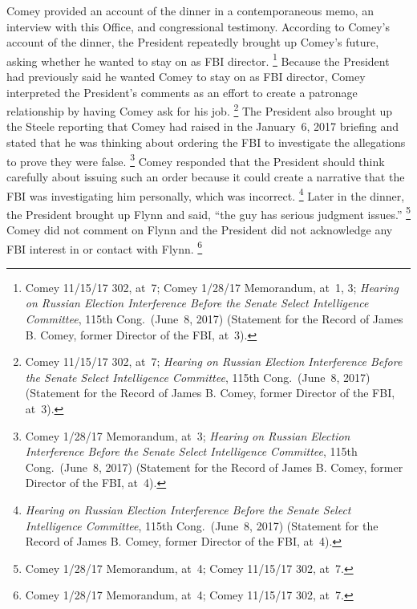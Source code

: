 Comey provided an account of the dinner in a contemporaneous memo, an interview with this Office, and congressional testimony.
According to Comey's account of the dinner, the President repeatedly brought up Comey's future, asking whether he wanted to stay on as FBI director.%
\footnote{Comey 11/15/17 302, at~7;
Comey 1/28/17 Memorandum, at~1, 3;
\textit{Hearing on Russian Election Interference Before the Senate Select Intelligence Committee}, 115th Cong.\ (June~8, 2017) (Statement for the Record of James B. Comey, former Director of the FBI, at~3).}
Because the President had previously said he wanted Comey to stay on as FBI director, Comey interpreted the President's comments as an effort to create a patronage relationship by having Comey ask for his job.%
\footnote{Comey 11/15/17 302, at~7;
\textit{Hearing on Russian Election Interference Before the Senate Select Intelligence Committee}, 115th Cong.\ (June~8, 2017) (Statement for the Record of James B. Comey, former Director of the FBI, at~3).}
The President also brought up the Steele reporting that Comey had raised in the January~6, 2017 briefing and stated that he was thinking about ordering the FBI to investigate the allegations to prove they were false.%
\footnote{Comey 1/28/17 Memorandum, at~3;
\textit{Hearing on Russian Election Interference Before the Senate Select Intelligence Committee}, 115th Cong.\ (June~8, 2017) (Statement for the Record of James B. Comey, former Director of the FBI, at~4).}
Comey responded that the President should think carefully about issuing such an order because it could create a narrative that the FBI was investigating him personally, which was incorrect.%
\footnote{\textit{Hearing on Russian Election Interference Before the Senate Select Intelligence Committee}, 115th Cong.\ (June~8, 2017) (Statement for the Record of James B. Comey, former Director of the FBI, at~4).}
Later in the dinner, the President brought up Flynn and said, ``the guy has serious judgment issues.''%
\footnote{Comey 1/28/17 Memorandum, at~4;
Comey 11/15/17 302, at~7.}
Comey did not comment on Flynn and the President did not acknowledge any FBI interest in or contact with Flynn.%
\footnote{Comey 1/28/17 Memorandum, at~4;
Comey 11/15/17 302, at~7.}

